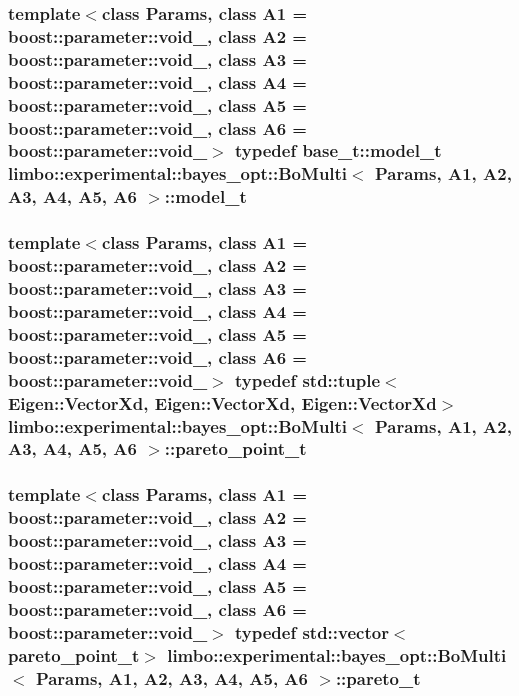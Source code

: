 \subsubsection[{model\+\_\+t}]{\setlength{\rightskip}{0pt plus 5cm}template$<$class Params, class A1 = boost\+::parameter\+::void\+\_\+, class A2 = boost\+::parameter\+::void\+\_\+, class A3 = boost\+::parameter\+::void\+\_\+, class A4 = boost\+::parameter\+::void\+\_\+, class A5 = boost\+::parameter\+::void\+\_\+, class A6 = boost\+::parameter\+::void\+\_\+$>$ typedef {\bf base\+\_\+t\+::model\+\_\+t} {\bf limbo\+::experimental\+::bayes\+\_\+opt\+::\+Bo\+Multi}$<$ Params, A1, A2, A3, A4, A5, A6 $>$\+::{\bf model\+\_\+t}}\label{classlimbo_1_1experimental_1_1bayes__opt_1_1_bo_multi_a94e37f45e30ac591bacf36df6767d6ad}
\hypertarget{classlimbo_1_1experimental_1_1bayes__opt_1_1_bo_multi_a1a48dd47159458edc16374082379879e}{}
\subsubsection[{pareto\+\_\+point\+\_\+t}]{\setlength{\rightskip}{0pt plus 5cm}template$<$class Params, class A1 = boost\+::parameter\+::void\+\_\+, class A2 = boost\+::parameter\+::void\+\_\+, class A3 = boost\+::parameter\+::void\+\_\+, class A4 = boost\+::parameter\+::void\+\_\+, class A5 = boost\+::parameter\+::void\+\_\+, class A6 = boost\+::parameter\+::void\+\_\+$>$ typedef std\+::tuple$<$Eigen\+::\+Vector\+Xd, Eigen\+::\+Vector\+Xd, Eigen\+::\+Vector\+Xd$>$ {\bf limbo\+::experimental\+::bayes\+\_\+opt\+::\+Bo\+Multi}$<$ Params, A1, A2, A3, A4, A5, A6 $>$\+::{\bf pareto\+\_\+point\+\_\+t}}\label{classlimbo_1_1experimental_1_1bayes__opt_1_1_bo_multi_a1a48dd47159458edc16374082379879e}
\hypertarget{classlimbo_1_1experimental_1_1bayes__opt_1_1_bo_multi_ae2b586fb9056fdfba859b288927a2f1c}{}
\subsubsection[{pareto\+\_\+t}]{\setlength{\rightskip}{0pt plus 5cm}template$<$class Params, class A1 = boost\+::parameter\+::void\+\_\+, class A2 = boost\+::parameter\+::void\+\_\+, class A3 = boost\+::parameter\+::void\+\_\+, class A4 = boost\+::parameter\+::void\+\_\+, class A5 = boost\+::parameter\+::void\+\_\+, class A6 = boost\+::parameter\+::void\+\_\+$>$ typedef std\+::vector$<${\bf pareto\+\_\+point\+\_\+t}$>$ {\bf limbo\+::experimental\+::bayes\+\_\+opt\+::\+Bo\+Multi}$<$ Params, A1, A2, A3, A4, A5, A6 $>$\+::{\bf pareto\+\_\+t}}\label{classlimbo_1_1experimental_1_1bayes__opt_1_1_bo_multi_ae2b586fb9056fdfba859b288927a2f1c}


